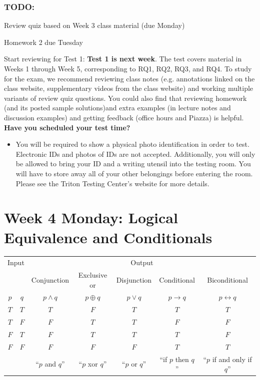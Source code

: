 \documentclass[12pt, oneside]{article}
\begin{document}
\vfill


\subsubsection*{TODO:}
\begin{list}
   {\itemsep2pt}
    \item Review quiz based on Week 3 class material (due Monday)
    \item Homework 2 due Tuesday
   \item Start reviewing for Test 1: {\bf Test 1 is next week}. The test covers material in Weeks 1 through Week 5, corresponding to RQ1, RQ2, RQ3, and RQ4. To study for the exam, we recommend reviewing class notes (e.g. annotations linked on the class website, supplementary videos from the class website) and working multiple variants of review quiz questions. You could also find that reviewing homework (and its posted sample solutions)and extra examples (in lecture notes and discussion examples) and getting feedback (office hours and Piazza) is helpful. {\bf Have you scheduled your test time?} 
    \begin{itemize}
    \item You will be required to show a physical photo identification in order
to test. Electronic IDs and photos of IDs are not accepted. Additionally, you will only be allowed
to bring your ID and a writing utensil into the testing room. You will have to store away all of
your other belongings before entering the room. Please see the Triton Testing Center’s website
for more details.
    \end{itemize}
\end{list}

\newpage

\section*{Week 4 Monday: Logical Equivalence and Conditionals}


\begin{center}
    \begin{tabular}{cc||c|c|c|c|c}
    \multicolumn{2}{c||}{Input}  & \multicolumn{5}{c}{Output} \\
     & & Conjunction &  Exclusive or & Disjunction  &  Conditional & Biconditional  \\
    $p$ & $q$ & $p \wedge q$ &  $p  \oplus  q$ & $p \vee  q$ & $p \to q$ & $p \leftrightarrow q$\\
    \hline
    $T$ & $T$ & $T$ & $F$ & $T$ & $T$& $T$\\
    $T$ & $F$ & $F$ & $T$ & $T$ & $F$& $F$\\
    $F$ & $T$ & $F$ & $T$ & $T$ & $T$& $F$\\
    $F$ & $F$ & $F$ & $F$ & $F$ & $T$& $T$\\
    \hline
    && ``$p$ and $q$'' & ``$p$ xor $q$'' & ``$p$ or $q$'' & ``if $p$ then $q$'' & ``$p$ if and only if $q$''
    \end{tabular}
\end{center}
     
\end{document}
